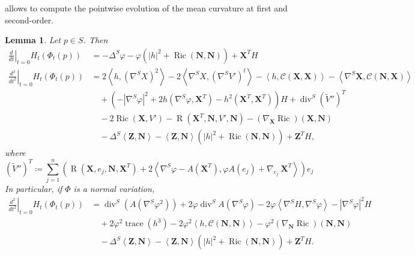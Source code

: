 \documentclass[11pt]{amsart}
\newcommand{\n}[1]{\nabla^\varepsilon_{ #1 }}
\renewcommand{\j}{\mathcal{C}}
\newcommand{\X}{\mathbf{X}}
\newcommand{\Z}{\mathbf{Z}}
\renewcommand{\n}{\mathbf{N}}
\DeclareMathOperator{\ric}{Ric}
\DeclareMathOperator{\divv}{div}
\DeclareMathOperator{\trace}{trace}
\DeclareMathOperator{\R}{R}
\newtheorem{lemma}[theorem]{Lemma}
\theoremstyle{definition}
\theoremstyle{remark}
\numberwithin{equation}{section}
\begin{document}
 allows to compute the pointwise evolution of the mean curvature at first and second-order.
\begin{lemma}\label{lemmavariazioneprimacurvaturaeseconda}
    Let $p\in S$. Then 
    \begin{align}
        \left.\frac{d}{dt}\right|_{t=0}H_t\left(\Phi_t(p)\right)&=-\Delta^S\varphi-\varphi\left(|h|^2+\ric(\n,\n)\right)+ \X^T H\label{derprimhinstatement}\\   
         \left.\frac{d^2}{dt^2}\right|_{t=0}H_t\left(\Phi_t(p)\right)&=2\left\langle h,\left(\nabla^S X\right)^2\right\rangle-2\left\langle \nabla^S X,\left(\nabla^SV'\right)^t\right\rangle-\left\langle h,\j(\X,\X)\right\rangle-\left\langle\nabla^S \X,\j(\n,\X)\right\rangle\label{dersechinstatement}\\
         &\quad+\left(-\left|\nabla^S\varphi\right|^2+2h\left(\nabla^S\varphi, \X^T\right)-h^2\left( \X^T, \X^T\right)\right)H+\divv^S\left( \tilde V''\right)^T\nonumber\\
         &\quad-2\ric(\X,V')-\R\left(\X^T,\n,V',\n\right)-\left(\nabla_\X \ric\right)(\X,\n)\nonumber\\
         &\quad-\Delta^S\left \langle\Z,\n\right\rangle-\left\langle\Z,\n\right\rangle\left(|h|^2+\ric(\n,\n)\right)+\Z^T H,\nonumber
    \end{align}
    where 
    \begin{equation*}
        \left(\tilde V''\right)^T\coloneqq \sum_{j=1}^n\left(\R(\X,e_j,\n,\X^T)+2\left\langle \nabla^S\varphi- A\left( \X^T\right) ,\varphi A(e_j)+\nabla_{e_j}\ \X^T\right\rangle\right)e_j
    \end{equation*}
    In particular, if $\Phi$ is a normal variation,
    \begin{equation}\label{secvarhnorm}
        \begin{split}
           \left.\frac{d^2}{dt^2}\right|_{t=0}H_t\left(\Phi_t(p)\right)&=\divv^S \left( A\left(\nabla^S\varphi^2\right)\right)+2\varphi\divv^S A\left(\nabla^S\varphi\right)-2\varphi\left\langle \nabla^S H,\nabla^S\varphi\right\rangle-\left|\nabla^S\varphi\right|^2H\\
                &\quad+2\varphi^2\trace\left(h^3\right)-2\varphi^2\left\langle h,\j(\n,\n)\right\rangle-\varphi^2\left(\nabla_\n \ric\right)(\n,\n)\\
         &\quad-\Delta^S\left \langle\Z,\n\right\rangle-\left\langle\Z,\n\right\rangle\left(|h|^2+\ric(\n,\n)\right)+\Z^T H.
        \end{split}
    \end{equation}
\end{lemma}
\end{document}
